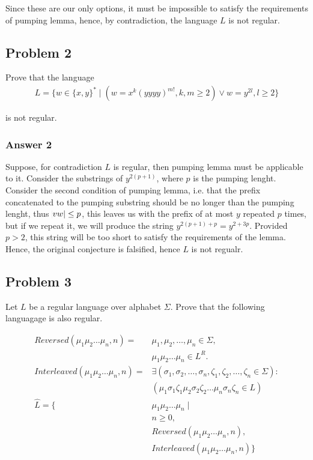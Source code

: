 \documentclass[11pt]{article}
\begin{document}
Since these are our only options, it must be impossible to satisfy the
requirements of pumping lemma, hence, by contradiction, the language \(L\) is
not regular.

\subsection{Problem 2}
\label{sec:orgheadline4}
Prove that the language
\begin{align*}
  L = \{w \in \{x, y\}^* \;|\; (w = x^k(yyyy)^{m!},
  k,m \geq 2) \lor w = y^{2l}, l \geq 2 \}
\end{align*}

is not regular.

\subsubsection{Answer 2}
\label{sec:orgheadline3}
Suppose, for contradiction \(L\) is regular, then pumping lemma must be
applicable to it.  Consider the substrings of \(y^{2(p+1)}\), where \(p\) is the
pumping lenght.  Consider the second condition of pumping lemma, i.e. that
the prefix concatenated to the pumping substring should be no longer than
the pumping lenght, thus \(\abs{vw} \leq p\), this leaves us with the prefix
of at most \(y\) repeated \(p\) times, but if we repeat it, we will produce the
string \(y^{2(p+1)+p} = y^{2+3p}\).  Provided \(p > 2\), this string will be too
short to satisfy the requirements of the lemma.  Hence, the original
conjecture is falsified, hence \(L\) is not regualr.

\subsection{Problem 3}
\label{sec:orgheadline6}
Let \(L\) be a regular language over alphabet \(\Sigma\).  Prove that the following
languagage is also regular.

\begin{align*}
  Reversed(\mu_1 \mu_2 \dots \mu_n, n) = &\mu_1, \mu_2, \dots, \mu_n \in \Sigma, \\
                                         &\mu_1 \mu_2 \dots \mu_n \in L^R. \\
  Interleaved(\mu_1 \mu_2 \dots \mu_n, n) = &\exists (\sigma_1, \sigma_2, \dots, \sigma_n,
                                              \zeta_1, \zeta_2, \dots, \zeta_n \in \Sigma): \\
                                         &(\mu_1 \sigma_1 \zeta_1 \mu_2 \sigma_2 \zeta_2 
                                           \dots \mu_n \sigma_n \zeta_n \in L) \\
  \hat{L} = \{ &\mu_1 \mu_2 \dots \mu_n \;|\; \\
                                         &n \geq 0, \\
                                         &Reversed(\mu_1 \mu_2 \dots \mu_n, n), \\
                                         &Interleaved(\mu_1 \mu_2 \dots \mu_n, n) \}
\end{align*}
\end{document}
